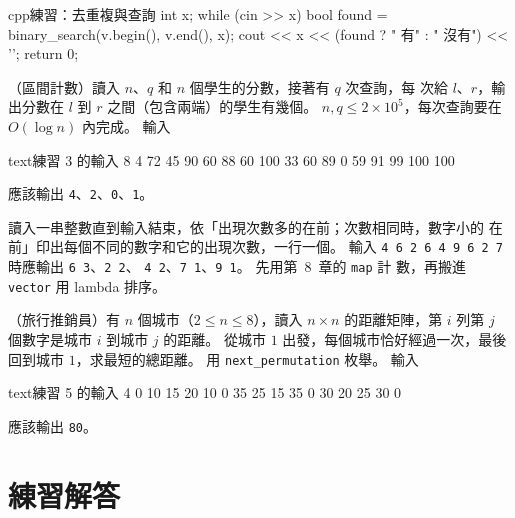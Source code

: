 \begin{drills}[label=drills:ch9]
\begin{code}{cpp}{練習：去重複與查詢}
{    int x;
    while (cin >> x) {
        bool found = binary_search(v.begin(), v.end(), x);
        cout << x << (found ? " 有" : " 沒有") << '\n';
    }
    return 0;
}
\end{code}
\item （區間計數）讀入 $n$、$q$ 和 $n$ 個學生的分數，接著有 $q$ 次查詢，每
次給 $l$、$r$，輸出分數在 $l$ 到 $r$ 之間（包含兩端）的學生有幾個。
$n, q \le 2 \times 10^5$，每次查詢要在 $O(\log n)$ 內完成。 輸入
\begin{code}{text}{練習 3 的輸入}
8 4
72 45 90 60 88 60 100 33
60 89
0 59
91 99
100 100
\end{code}
應該輸出 \texttt{4}、\texttt{2}、\texttt{0}、\texttt{1}。
\item 讀入一串整數直到輸入結束，依「出現次數多的在前；次數相同時，數字小的
在前」印出每個不同的數字和它的出現次數，一行一個。 輸入
\texttt{4 6 2 6 4 9 6 2 7} 時應輸出 \texttt{6 3}、\texttt{2 2}、
\texttt{4 2}、\texttt{7 1}、\texttt{9 1}。 先用第~8~章的 \texttt{map} 計
數，再搬進 \texttt{vector} 用 lambda 排序。
\item （旅行推銷員）有 $n$ 個城市（$2 \le n \le 8$），讀入 $n \times n$
的距離矩陣，第 $i$ 列第 $j$ 個數字是城市 $i$ 到城市 $j$ 的距離。 從城市
$1$ 出發，每個城市恰好經過一次，最後回到城市 $1$，求最短的總距離。 用
\texttt{next\_permutation} 枚舉。 輸入
\begin{code}{text}{練習 5 的輸入}
4
0 10 15 20
10 0 35 25
15 35 0 30
20 25 30 0
\end{code}
應該輸出 \texttt{80}。
\end{drills}

\section*{練習解答}

